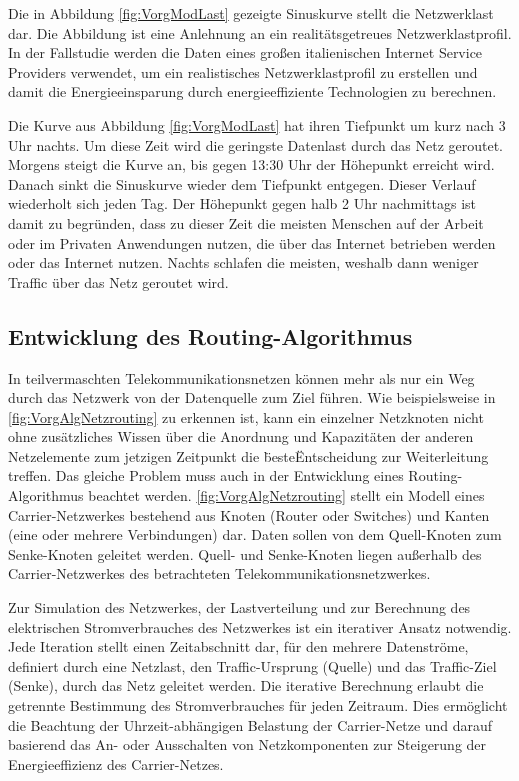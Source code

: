 Die in Abbildung \ref{fig:VorgModLast} gezeigte Sinuskurve stellt die Netzwerklast dar. Die Abbildung ist eine Anlehnung an ein realitätsgetreues Netzwerklastprofil. In der Fallstudie \cite[1]{Chiaraviglio2009} werden die Daten eines großen italienischen Internet Service Providers verwendet, um ein realistisches Netzwerklastprofil zu erstellen und damit die Energieeinsparung durch energieeffiziente Technologien zu berechnen.

Die Kurve aus Abbildung \ref{fig:VorgModLast} hat ihren Tiefpunkt um kurz nach 3 Uhr nachts. Um diese Zeit wird die geringste Datenlast durch das Netz geroutet. Morgens steigt die Kurve an, bis gegen 13:30 Uhr der Höhepunkt erreicht wird. Danach sinkt die Sinuskurve wieder dem Tiefpunkt entgegen. Dieser Verlauf wiederholt sich jeden Tag. Der Höhepunkt gegen halb 2 Uhr nachmittags ist damit zu begründen, dass zu dieser Zeit die meisten Menschen auf der Arbeit oder im Privaten Anwendungen nutzen, die über das Internet betrieben werden oder das Internet nutzen. Nachts schlafen die meisten, weshalb dann weniger Traffic über das Netz geroutet wird. 

\subsection{Entwicklung des Routing-Algorithmus}\label{subsec:VorgAlg}
In teilvermaschten Telekommunikationsnetzen können mehr als nur ein Weg durch das Netzwerk von der Datenquelle zum Ziel führen. Wie beispielsweise in \ref{fig:VorgAlgNetzrouting} zu erkennen ist, kann ein einzelner Netzknoten nicht ohne zusätzliches Wissen über die Anordnung und Kapazitäten der anderen Netzelemente zum jetzigen Zeitpunkt die \"beste\" Entscheidung zur Weiterleitung treffen. Das gleiche Problem muss auch in der Entwicklung eines Routing-Algorithmus beachtet werden. \ref{fig:VorgAlgNetzrouting} stellt ein Modell eines Carrier-Netzwerkes bestehend aus Knoten (Router oder Switches) und Kanten (eine oder mehrere Verbindungen) dar. Daten sollen von dem Quell-Knoten zum Senke-Knoten geleitet werden. Quell- und Senke-Knoten liegen außerhalb des Carrier-Netzwerkes des betrachteten Telekommunikationsnetzwerkes.

Zur Simulation des Netzwerkes, der Lastverteilung und zur Berechnung des elektrischen Stromverbrauches des Netzwerkes ist ein iterativer Ansatz notwendig. Jede Iteration stellt einen Zeitabschnitt dar, für den mehrere Datenströme, definiert durch eine Netzlast, den Traffic-Ursprung (Quelle) und das Traffic-Ziel (Senke), durch das Netz geleitet werden. Die iterative Berechnung erlaubt die getrennte Bestimmung des Stromverbrauches für jeden Zeitraum. Dies ermöglicht die Beachtung der Uhrzeit-abhängigen Belastung der Carrier-Netze und darauf basierend das An- oder Ausschalten von Netzkomponenten zur Steigerung der Energieeffizienz des Carrier-Netzes.  

